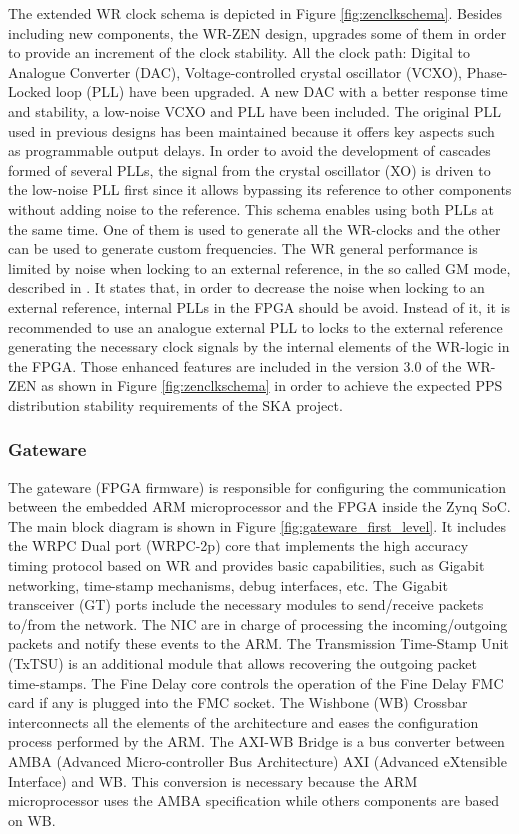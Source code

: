 The extended WR clock schema is depicted in Figure \ref{fig:zenclkschema}.
Besides including new components, the WR-ZEN design, upgrades some of them
in order to provide an increment of the clock stability. All the clock path: Digital to Analogue Converter (DAC), Voltage-controlled crystal oscillator (VCXO), Phase-Locked loop (PLL) have been upgraded. A new DAC with a better
response time and stability, a low-noise VCXO and PLL have been included. 
The original PLL used in previous designs has been maintained because it offers key aspects such as programmable output delays. In order to avoid the development of cascades formed of several PLLs, the signal from the crystal oscillator (XO) is driven to the low-noise PLL first since it allows bypassing its reference to other components without adding noise to the reference. This schema enables using both PLLs at the same time. One of them is used to generate all the WR-clocks and the other can be used to generate custom frequencies. The WR general performance is limited by noise when locking to an external reference, in the so called GM mode, described in \cite{Rizzi2016}. It states that, in order to decrease the noise when locking to an external reference, internal PLLs in the FPGA should be avoid. Instead of it, it is recommended to use an analogue external PLL to locks to the external reference generating the necessary clock signals by the internal elements of the WR-logic in the FPGA. Those enhanced features are included in the version 3.0 of the WR-ZEN as shown in Figure \ref{fig:zenclkschema} in order to achieve the expected PPS distribution stability requirements of the SKA project.


\subsubsection{Gateware} \label{subsec:gateware}

The gateware (FPGA firmware) is responsible for configuring the communication between the embedded ARM microprocessor and the FPGA inside the Zynq SoC. 
The main block diagram is shown in Figure \ref{fig:gateware_first_level}. 
It includes the WRPC Dual port (WRPC-2p) core that implements the high accuracy timing protocol based on WR and provides basic capabilities, such as Gigabit networking, time-stamp mechanisms, debug interfaces, etc. The Gigabit transceiver (GT) ports include the necessary modules to send/receive packets to/from the network. The NIC are in charge of processing the incoming/outgoing
packets and notify these events to the ARM. The Transmission Time-Stamp Unit
(TxTSU) is an additional module that allows recovering the outgoing packet
time-stamps. The Fine Delay core controls the operation of the Fine Delay FMC
card if any is plugged into the FMC socket. The Wishbone (WB) Crossbar
interconnects all the elements of the architecture and eases the configuration
process performed by the ARM. The AXI-WB Bridge is a bus converter between AMBA (Advanced Micro-controller Bus Architecture)
AXI (Advanced eXtensible Interface) and WB. This conversion is necessary because the ARM microprocessor
uses the AMBA specification while others components are based on WB.

